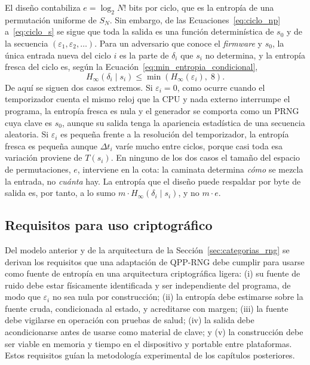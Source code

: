 El diseño contabiliza $e = \log_2 N!$ bits por ciclo, que es la entropía de una permutación uniforme de $S_N$. Sin embargo, de las Ecuaciones~\eqref{eq:ciclo_np} a~\eqref{eq:ciclo_s} se sigue que toda la salida es una función determinística de $s_0$ y de la secuencia $(\varepsilon_1, \varepsilon_2, \ldots)$. Para un adversario que conoce el \textit{firmware} y $s_0$, la única entrada nueva del ciclo $i$ es la parte de $\delta_i$ que $s_i$ no determina, y la entropía fresca del ciclo es, según la Ecuación~\eqref{eq:min_entropia_condicional},
\begin{equation}
    H_\infty(\delta_i \mid s_i) \leq \min\!\left( H_\infty(\varepsilon_i),\; 8 \right).
    \label{eq:entropia_fresca}
\end{equation}
De aquí se siguen dos casos extremos. Si $\varepsilon_i = 0$, como ocurre cuando el temporizador cuenta el mismo reloj que la CPU y nada externo interrumpe el programa, la entropía fresca es nula y el generador se comporta como un PRNG cuya clave es $s_0$, aunque su salida tenga la apariencia estadística de una secuencia aleatoria. Si $\varepsilon_i$ es pequeña frente a la resolución del temporizador, la entropía fresca es pequeña aunque $\Delta t_i$ varíe mucho entre ciclos, porque casi toda esa variación proviene de $T(s_i)$. En ninguno de los dos casos el tamaño del espacio de permutaciones, $e$, interviene en la cota: la caminata determina \emph{cómo} se mezcla la entrada, no \emph{cuánta} hay. La entropía que el diseño puede respaldar por byte de salida es, por tanto, a lo sumo $m \cdot H_\infty(\delta_i \mid s_i)$, y no $m \cdot e$.

\subsection{Requisitos para uso criptográfico}

Del modelo anterior y de la arquitectura de la Sección~\ref{sec:categorias_rng} se derivan los requisitos que una adaptación de QPP-RNG debe cumplir para usarse como fuente de entropía en una arquitectura criptográfica ligera: (i) su fuente de ruido debe estar físicamente identificada y ser independiente del programa, de modo que $\varepsilon_i$ no sea nula por construcción; (ii) la entropía debe estimarse sobre la fuente cruda, condicionada al estado, y acreditarse con margen; (iii) la fuente debe vigilarse en operación con pruebas de salud; (iv) la salida debe acondicionarse antes de usarse como material de clave; y (v) la construcción debe ser viable en memoria y tiempo en el dispositivo y portable entre plataformas. Estos requisitos guían la metodología experimental de los capítulos posteriores.

